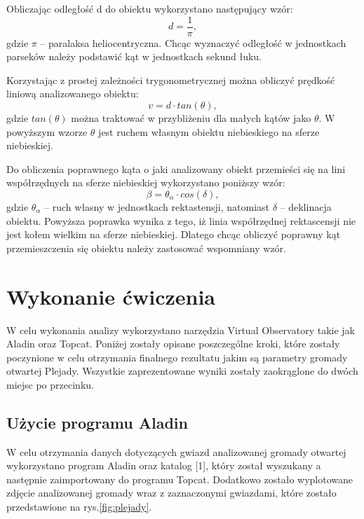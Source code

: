 \documentclass{aa}
\begin{document}
Obliczając odległość d do obiektu wykorzystano następujący wzór:
\begin{equation}
    d = \frac{1}{\pi},
    \label{odleglosc}
\end{equation}
gdzie $\pi$ -- paralaksa heliocentryczna. Chcąc wyznaczyć odległość w jednostkach parseków należy podstawić kąt w jednostkach sekund łuku. 

Korzystając z prostej zależności trygonometrycznej można obliczyć prędkość liniową analizowanego obiektu: 
\begin{equation}
    v = d \cdot tan(\theta),
    \label{ruch_wlasny}
\end{equation}
gdzie $tan(\theta)$ można traktować w przybliżeniu dla małych kątów jako $\theta$. W powyższym wzorze $\theta$ jest ruchem własnym obiektu niebieskiego na sferze niebieskiej. 

Do obliczenia poprawnego kąta o jaki analizowany obiekt przemieści się na lini współrzędnych na sferze niebieskiej wykorzystano poniższy wzór: 
\begin{equation}
    \beta = \theta_\alpha \cdot cos(\delta),
    \label{poprawka}
\end{equation}
gdzie $\theta_\alpha$ -- ruch własny w jednostkach rektastensji, natomiast $\delta$ -- deklinacja obiektu. Powyższa poprawka wynika z tego, iż linia współrzędnej rektascensji nie jest kołem wielkim na sferze niebieskiej. Dlatego chcąc obliczyć poprawny kąt przemieszczenia się obiektu należy zastosować wspomniany wzór. 
\section{Wykonanie ćwiczenia}
W celu wykonania analizy wykorzystano narzędzia Virtual Observatory takie jak Aladin oraz Topcat. Poniżej zostały opisane poszczególne kroki, które zostały poczynione w celu otrzymania finalnego rezultatu jakim są parametry gromady otwartej Plejady. Wszystkie zaprezentowane wyniki zostały zaokrąglone do dwóch miejsc po przecinku. 
\subsection{Użycie programu Aladin}
W celu otrzymania danych dotyczących gwiazd analizowanej gromady otwartej wykorzystano program Aladin oraz katalog [1], który został wyszukany a następnie zaimportowany do programu Topcat. Dodatkowo zostało wyplotowane zdjęcie analizowanej gromady wraz z zaznaczonymi gwiazdami, które zostało przedstawione na  rys.\ref{fig:plejady}. 
\end{document}
